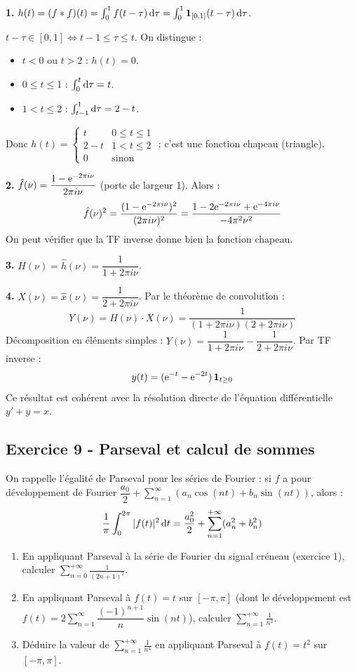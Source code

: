 \documentclass[12pt,a4paper]{article}
\begin{document}
\begin{boitecorrige}
\textbf{1.} $h(t) = (f*f)(t) = \int_0^1 f(t-\tau)\,\mathrm{d}\tau = \int_0^1 \mathbf{1}_{[0,1]}(t-\tau)\,\mathrm{d}\tau$.

$t-\tau\in[0,1] \Leftrightarrow t-1\leq\tau\leq t$. On distingue :
\begin{itemize}[nosep]
  \item $t < 0$ ou $t > 2$ : $h(t) = 0$.
  \item $0 \leq t \leq 1$ : $\int_0^t\mathrm{d}\tau = t$.
  \item $1 < t \leq 2$ : $\int_{t-1}^1\mathrm{d}\tau = 2-t$.
\end{itemize}
Donc $h(t) = \begin{cases}t & 0\leq t\leq1\\2-t & 1<t\leq2\\0 & \text{sinon}\end{cases}$ : c'est une fonction chapeau (triangle).

\textbf{2.} $\hat{f}(\nu) = \dfrac{1-\mathrm{e}^{-2\pi i\nu}}{2\pi i\nu}$ (porte de largeur 1). Alors :
\[
\hat{f}(\nu)^2 = \frac{(1-\mathrm{e}^{-2\pi i\nu})^2}{(2\pi i\nu)^2} = \frac{1-2\mathrm{e}^{-2\pi i\nu}+\mathrm{e}^{-4\pi i\nu}}{-4\pi^2\nu^2}
\]
On peut vérifier que la TF inverse donne bien la fonction chapeau.

\textbf{3.} $H(\nu) = \hat{h}(\nu) = \dfrac{1}{1+2\pi i\nu}$.

\textbf{4.} $X(\nu) = \hat{x}(\nu) = \dfrac{1}{2+2\pi i\nu}$. Par le théorème de convolution :
\[
Y(\nu) = H(\nu)\cdot X(\nu) = \frac{1}{(1+2\pi i\nu)(2+2\pi i\nu)}
\]
Décomposition en éléments simples : $Y(\nu) = \dfrac{1}{1+2\pi i\nu} - \dfrac{1}{2+2\pi i\nu}$. Par TF inverse :
\[
y(t) = (\mathrm{e}^{-t} - \mathrm{e}^{-2t})\,\mathbf{1}_{t\geq0}
\]
Ce résultat est cohérent avec la résolution directe de l'équation différentielle $y' + y = x$.
\end{boitecorrige}

\subsection*{Exercice 9 - Parseval et calcul de sommes \niveau{\moyen}}

\begin{boiteexercice}
On rappelle l'égalité de Parseval pour les séries de Fourier : si $f$ a pour développement de Fourier $\dfrac{a_0}{2}+\sum_{n=1}^\infty(a_n\cos(nt)+b_n\sin(nt))$, alors :
\[
\frac{1}{\pi}\int_0^{2\pi}|f(t)|^2\,\mathrm{d} t = \frac{a_0^2}{2} + \sum_{n=1}^{+\infty}(a_n^2+b_n^2)
\]
\begin{enumerate}
  \item En appliquant Parseval à la série de Fourier du signal créneau (exercice 1), calculer $\displaystyle\sum_{n=0}^{+\infty}\frac{1}{(2n+1)^2}$.
  \item En appliquant Parseval à $f(t) = t$ sur $[-\pi,\pi]$ (dont le développement est $f(t)=2\sum_{n=1}^\infty\dfrac{(-1)^{n+1}}{n}\sin(nt)$), calculer $\displaystyle\sum_{n=1}^{+\infty}\frac{1}{n^2}$.
  \item Déduire la valeur de $\displaystyle\sum_{n=1}^{+\infty}\frac{1}{n^4}$ en appliquant Parseval à $f(t)=t^2$ sur $[-\pi,\pi]$.
\end{enumerate}
\end{boiteexercice}
\end{document}
